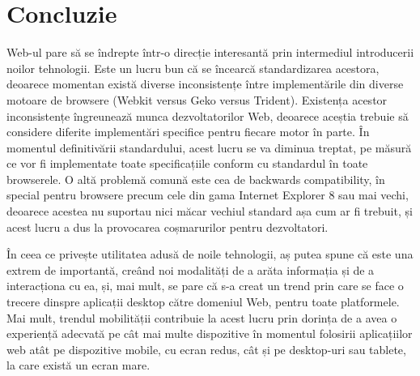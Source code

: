 \documentclass[12pt]{article} %
\begin{document}

\section{Concluzie} %

Web-ul pare să se îndrepte într-o direcție interesantă prin intermediul introducerii noilor tehnologii.
Este un lucru bun că se încearcă standardizarea acestora, deoarece momentan există diverse inconsistențe
între implementările din diverse motoare de browsere (Webkit versus Geko versus Trident). Existența acestor
inconsistențe îngreunează munca dezvoltatorilor Web, deoarece aceștia trebuie să considere diferite
implementări specifice pentru fiecare motor în parte. În momentul definitivării standardului, acest lucru
se va diminua treptat, pe măsură ce vor fi implementate toate specificațiile conform cu standardul în
toate browserele. O altă problemă comună este cea de backwards compatibility, în special pentru browsere
precum cele din gama Internet Explorer 8 sau mai vechi, deoarece acestea nu suportau nici măcar vechiul
standard așa cum ar fi trebuit, și acest lucru a dus la provocarea coșmarurilor pentru dezvoltatori.

În ceea ce privește utilitatea adusă de noile tehnologii, aș putea spune că este una extrem de importantă,
creând noi modalități de a arăta informația și de a interacționa cu ea, și, mai mult, se pare că s-a creat
un trend prin care se face o trecere dinspre aplicații desktop către domeniul Web, pentru toate platformele.
Mai mult, trendul mobilității contribuie la acest lucru prin dorința de a avea o experiență adecvată pe
cât mai multe dispozitive în momentul folosirii aplicațiilor web atât pe dispozitive mobile, cu ecran redus,
cât și pe desktop-uri sau tablete, la care există un ecran mare.

\newpage %

{}


\end{document}
